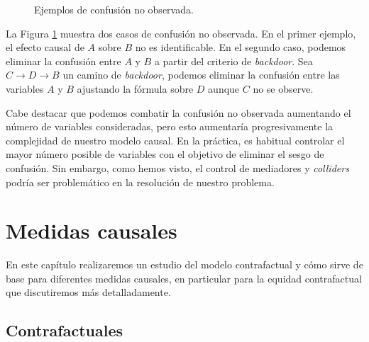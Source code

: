 \documentclass[oneside,openright,titlepage,numbers=noenddot,openany,headinclude,footinclude=true,
cleardoublepage=empty,abstractoff,BCOR=5mm,paper=a4,fontsize=12pt,main=spanish]{scrreprt}
\begin{document}
\begin{figure}[h]
\centering
{}
\caption{Ejemplos de confusión no observada.}
\label{fig:unobserved}
\end{figure}

La Figura \ref{fig:unobserved} muestra dos casos de confusión no observada. En el primer ejemplo, el efecto causal de $A$ sobre $B$ no es identificable. En el segundo caso, podemos eliminar la confusión entre $A$ y $B$ a partir del criterio de \textit{backdoor}. Sea $C \to D \to B$ un camino de \textit{backdoor}, podemos eliminar la confusión entre las variables $A$ y $B$ ajustando la fórmula sobre $D$ aunque $C$ no se observe.

Cabe destacar que podemos combatir la confusión no observada aumentando el número de variables consideradas, pero esto aumentaría progresivamente la complejidad de nuestro modelo causal. En la práctica, es habitual controlar el mayor número posible de variables con el objetivo de eliminar el sesgo de confusión. Sin embargo, como hemos visto, el control de mediadores y \textit{colliders} podría ser problemático en la resolución de nuestro problema.


\chapter{Medidas causales}

En este capítulo realizaremos un estudio del modelo contrafactual y cómo sirve de base para diferentes medidas causales, en particular para la equidad contrafactual que discutiremos más detalladamente. 

\section{Contrafactuales}
\end{document}

